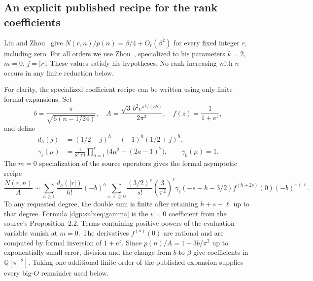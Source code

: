 \documentclass[11pt,letterpaper]{article}
\numberwithin{equation}{section}
\theoremstyle{remark}\newtheorem{remark}[theorem]{Remark}
\newcommand{\QQ}{\mathbb Q}
\begin{document}
\subsection{An explicit published recipe for the rank coefficients}
Liu and Zhou~\cite[Theorem 1.3]{lz} give
$N(r,n)/p(n)=\beta/4+O_r(\beta^2)$ for every fixed integer $r$,
including zero. For all orders we use Zhou~\cite[Theorem 4.1]{zhou},
specialized to his parameters $k=2$, $m=0$, $j=|r|$.
These values satisfy his hypotheses. No rank increasing with $n$
occurs in any finite reduction below.

For clarity, the specialized coefficient recipe can be written
using only finite formal expansions. Set
\[
 b=\frac\pi{\sqrt{6(n-1/24)}},\quad
 A=\frac{\sqrt3\,b^2e^{\pi^2/(3b)}}{2\pi^2},\quad
 f(z)=\frac1{1+e^z},
\]
and define
\begin{align}
 d_h(j)&=(1/2-j)^h-(-1)^h(1/2+j)^h,\label{dgp:sub:eq:dh}\\
 \gamma_\ell(\mu)&=\frac1{8^\ell\ell!}
    \prod_{a=1}^{\ell}\bigl(4\mu^2-(2a-1)^2\bigr),
       \qquad\gamma_0(\mu)=1.\label{dgp:sub:eq:gamma}
\end{align}
The $m=0$ specialization of the source operators gives the formal
asymptotic recipe
\begin{equation}\label{dgp:sub:eq:rankrecipe}
 \frac{N(r,n)}A\sim
 \sum_{h\geq1}\frac{d_h(|r|)}{h!}(-b)^h
 \sum_{s,\ell\geq0}\frac{(3/2)^s}{s!}
 \left(\frac3{\pi^2}\right)^\ell
 \gamma_\ell(-s-h-3/2)f^{(h+2s)}(0)(-b)^{s+\ell}.
\end{equation}
To any requested degree, the double sum is finite after retaining
$h+s+\ell$ up to that degree. Formula \eqref{dgp:sub:eq:gamma} is the
$v=0$ coefficient from the source's Proposition~2.2. Terms containing
positive powers of the evaluation variable vanish at $m=0$.
The derivatives $f^{(a)}(0)$ are rational and are computed by formal
inversion of $1+e^z$. Since
$p(n)/A=1-3b/\pi^2$ up to exponentially small error, division and the
change from $b$ to $\beta$ give coefficients in $\QQ[\pi^{-2}]$.
Taking one additional finite order of the published expansion
supplies every big-$O$ remainder used below.
\end{document}
